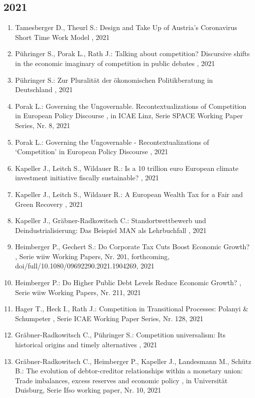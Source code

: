  \subsection*{2021} 
 \begin{enumerate}[leftmargin=*, labelsep=0.5cm] 
	 \item Tamesberger D., Theurl S.:  Design and Take Up of Austria’s Coronavirus Short Time Work Model  , 2021
	 \item Pühringer S., Porak L., Rath J.:  Talking about competition? Discursive shifts in the economic imaginary of competition in public debates  , 2021
	 \item Pühringer S.:  Zur Pluralität der ökonomischen Politikberatung in Deutschland  , 2021
	 \item Porak L.:  Governing the Ungovernable. Recontextualizations of Competition in European Policy Discourse  , in ICAE Linz, Serie SPACE Working Paper Series, Nr. 8, 2021
	 \item Porak L.:  Governing the Ungovernable - Recontextualizations of ‘Competition’ in European Policy Discourse  , 2021
	 \item Kapeller J., Leitch S., Wildauer R.:  Is a 10 trillion euro European climate investment initiative fiscally sustainable?  , 2021
	 \item Kapeller J., Leitch S., Wildauer R.:  A European Wealth Tax for a Fair and Green Recovery  , 2021
	 \item Kapeller J., Gräbner-Radkowitsch C.:  Standortwettbewerb und Deindustrialisierung: Das Beispiel MAN als Lehrbuchfall  , 2021
	 \item Heimberger P., Gechert S.:  Do Corporate Tax Cuts Boost Economic Growth?  , Serie wiiw Working Papers, Nr. 201, forthcoming, doi/full/10.1080/09692290.2021.1904269, 2021
	 \item Heimberger P.:  Do Higher Public Debt Levels Reduce Economic Growth?  , Serie wiiw Working Papers, Nr. 211, 2021
	 \item Hager T., Heck I., Rath J.:  Competition in Transitional Processes: Polanyi & Schumpeter  , Serie ICAE Working Paper Series, Nr. 128, 2021
	 \item Gräbner-Radkowitsch C., Pühringer S.:  Competition universalism: Its historical origins and timely alternatives  , 2021
	 \item Gräbner-Radkowitsch C., Heimberger P., Kapeller J., Landesmann M., Schütz B.:  The evolution of debtor-creditor relationships within a monetary union: Trade imbalances, excess reserves and economic policy  , in Universität Duisburg, Serie Ifso working paper, Nr. 10, 2021

\end{enumerate}
